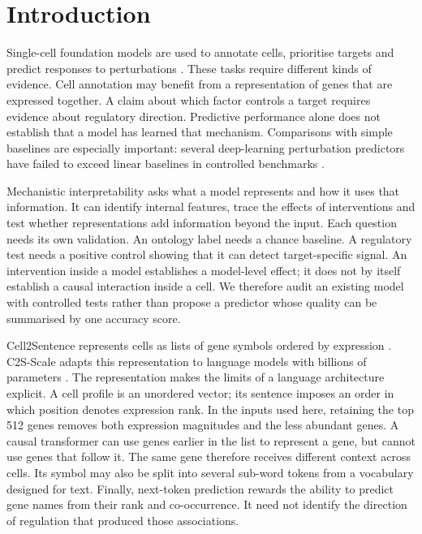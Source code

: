 \documentclass[review,authoryear,12pt]{elsarticle}
\begin{document}
\section{Introduction}

Single-cell foundation models are used to annotate cells, prioritise targets and predict responses to
perturbations \citep{ref3,ref4}. These tasks require different kinds of evidence. Cell annotation may
benefit from a representation of genes that are expressed together. A claim about which factor controls
a target requires evidence about regulatory direction. Predictive performance alone does not establish
that a model has learned that mechanism. Comparisons with simple baselines are especially important:
several deep-learning perturbation predictors have failed to exceed linear baselines in controlled
benchmarks \citep{refPerturbBaselines}.

Mechanistic interpretability asks what a model represents and how it uses that information. It can
identify internal features, trace the effects of interventions and test whether representations add
information beyond the input. Each question needs its own validation. An ontology label needs a chance
baseline. A regulatory test needs a positive control showing that it can detect target-specific signal.
An intervention inside a model establishes a model-level effect; it does not by itself establish a
causal interaction inside a cell. We therefore audit an existing model with controlled tests rather
than propose a predictor whose quality can be summarised by one accuracy score.

Cell2Sentence represents cells as lists of gene symbols ordered by expression \citep{ref1}.
C2S-Scale adapts this representation to language models with billions of parameters \citep{ref2}.
The representation makes the limits of a language architecture explicit. A cell profile is an unordered
vector; its sentence imposes an order in which position denotes expression rank. In the inputs used
here, retaining the top 512 genes removes both expression magnitudes and the less abundant genes.
A causal transformer can use genes earlier in the list to represent a gene, but cannot use genes
that follow it. The same gene therefore receives different context across cells. Its symbol may also
be split into several sub-word tokens from a vocabulary designed for text. Finally, next-token
prediction rewards the ability to predict gene names from their rank and co-occurrence. It need not
identify the direction of regulation that produced those associations.
\end{document}
